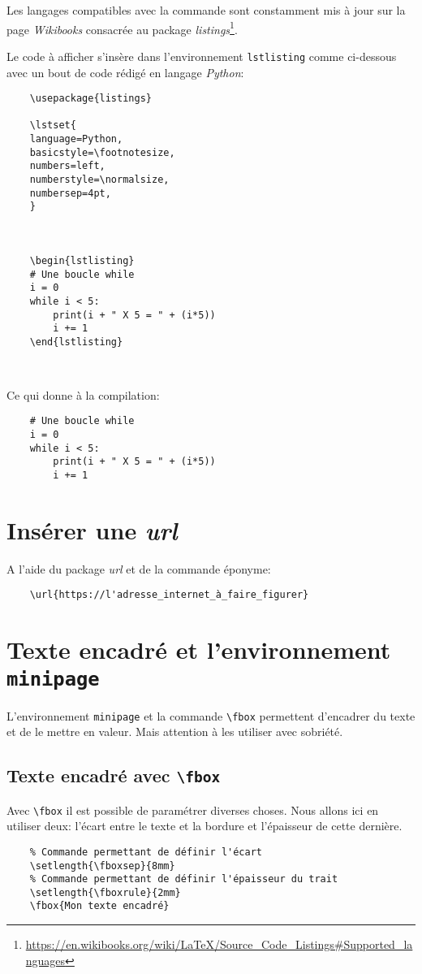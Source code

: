 Les langages compatibles avec la commande sont constamment mis à jour sur la page \textit{Wikibooks} consacrée au package \textit{listings}\footnote{\url{https://en.wikibooks.org/wiki/LaTeX/Source_Code_Listings#Supported_languages}}.
\medskip

Le code à afficher s'insère dans l'environnement \texttt{lstlisting} comme ci-dessous avec un bout de code rédigé en langage \textit{Python}:
\begin{verbatim}
    \usepackage{listings}
    
    \lstset{
    language=Python,
    basicstyle=\footnotesize,
    numbers=left,
    numberstyle=\normalsize,
    numbersep=4pt,
    }
    
    
    
    \begin{lstlisting}
    # Une boucle while
    i = 0
    while i < 5:
        print(i + " X 5 = " + (i*5))
        i += 1
    \end{lstlisting}
    
    
\end{verbatim}
\medskip

Ce qui donne à la compilation:
\begin{lstlisting}
    # Une boucle while
    i = 0
    while i < 5:
        print(i + " X 5 = " + (i*5))
        i += 1
\end{lstlisting}
\medskip

\section{Insérer une \textit{url}}
A l'aide du package \textit{url} et de la commande éponyme:
\begin{verbatim}
    \url{https://l'adresse_internet_à_faire_figurer}
\end{verbatim}
\medskip

\section{Texte encadré et l'environnement \texttt{minipage}}
L'environnement \texttt{minipage} et la commande \verb|\fbox| permettent d'encadrer du texte et de le mettre en valeur. Mais attention à les utiliser avec sobriété.
\medskip

\subsection*{Texte encadré avec \texttt{\textbackslash fbox}}
Avec \verb|\fbox| il est possible de paramétrer diverses choses. Nous allons ici en utiliser deux: l'écart entre le texte et la bordure et l'épaisseur de cette dernière.
\begin{verbatim}
    % Commande permettant de définir l'écart
    \setlength{\fboxsep}{8mm}
    % Commande permettant de définir l'épaisseur du trait
    \setlength{\fboxrule}{2mm}
    \fbox{Mon texte encadré}
\end{verbatim}
\medskip

